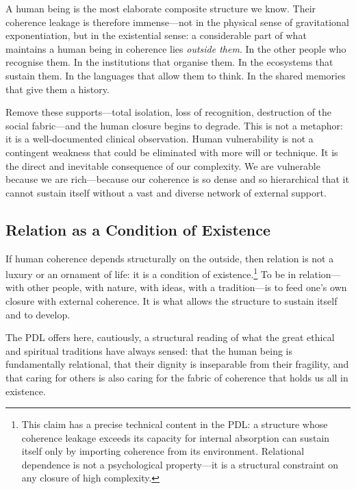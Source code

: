 \documentclass[12pt, a4paper, openright]{book}
\begin{document}
\medskip

A human being is the most elaborate composite structure we know. Their coherence leakage is therefore immense---not in the physical sense of gravitational exponentiation, but in the existential sense: a considerable part of what maintains a human being in coherence lies \emph{outside them}. In the other people who recognise them. In the institutions that organise them. In the ecosystems that sustain them. In the languages that allow them to think. In the shared memories that give them a history.

\medskip

Remove these supports---total isolation, loss of recognition, destruction of the social fabric---and the human closure begins to degrade. This is not a metaphor: it is a well-documented clinical observation. Human vulnerability is not a contingent weakness that could be eliminated with more will or technique. It is the direct and inevitable consequence of our complexity. We are vulnerable because we are rich---because our coherence is so dense and so hierarchical that it cannot sustain itself without a vast and diverse network of external support.

\subsection*{Relation as a Condition of Existence}

If human coherence depends structurally on the outside, then relation is not a luxury or an ornament of life: it is a condition of existence.\footnote{This claim has a precise technical content in the PDL: a structure whose coherence leakage exceeds its capacity for internal absorption can sustain itself only by importing coherence from its environment. Relational dependence is not a psychological property---it is a structural constraint on any closure of high complexity.} To be in relation---with other people, with nature, with ideas, with a tradition---is to feed one's own closure with external coherence. It is what allows the structure to sustain itself and to develop.

\medskip

The PDL offers here, cautiously, a structural reading of what the great ethical and spiritual traditions have always sensed: that the human being is fundamentally relational, that their dignity is inseparable from their fragility, and that caring for others is also caring for the fabric of coherence that holds us all in existence.
\end{document}
